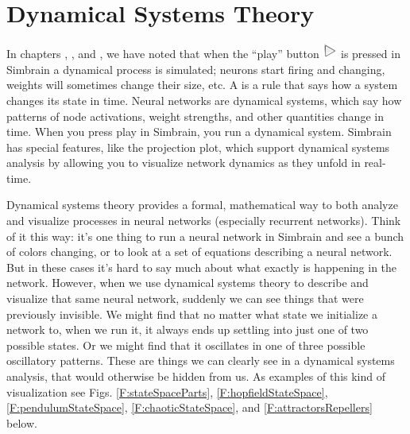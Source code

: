 \chapter{Dynamical Systems Theory}\label{ch_dst}

  In chapters , , and , we have noted that when the ``play''  button \includegraphics[scale=.5]{./images/Play.png} is pressed in Simbrain a dynamical process is simulated; neurons start firing and changing, weights will sometimes change their size, etc. 
A  is a rule that says how a system changes its state in time. Neural networks are dynamical systems,  which say how patterns of node activations, weight strengths, and other quantities change in time. When you press play in Simbrain, you run a dynamical system. Simbrain has special features, like the projection plot, which support dynamical systems analysis by allowing you to visualize network dynamics as they unfold in real-time.

Dynamical systems theory provides a formal, mathematical way to both analyze and visualize processes in neural networks (especially recurrent networks). Think of it this way: it's one thing to run a neural network in Simbrain and see a bunch of colors changing, or to look at a set of equations describing a neural network. But in these cases it's hard to say much about what exactly is happening in the network. However, when we use dynamical systems theory to describe and visualize that same neural network, suddenly we can see things that were previously invisible. We might find that no matter what state we initialize a network to, when we run it, it always ends up settling into just one of two possible states. Or we might find that it oscillates in one of three possible oscillatory patterns. These are things we can clearly see in a dynamical systems analysis, that would otherwise be hidden from us. As examples of this kind of visualization see  Figs. \ref{F:stateSpaceParts}, \ref{F:hopfieldStateSpace}, \ref{F:pendulumStateSpace}, \ref{F:chaoticStateSpace}, and \ref{F:attractorsRepellers} below.

